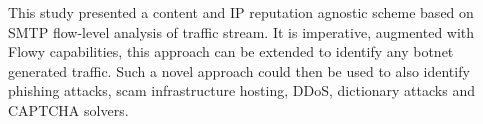 This study presented a content and \ac{IP} reputation agnostic scheme based on \ac{SMTP} flow-level analysis of traffic stream. It is imperative, augmented with Flowy capabilities, this approach can be extended to identify any botnet generated traffic.  Such a novel approach could then be used to also identify phishing attacks, scam infrastructure hosting, \ac{DDoS}, dictionary attacks and \ac{CAPTCHA} solvers.    
